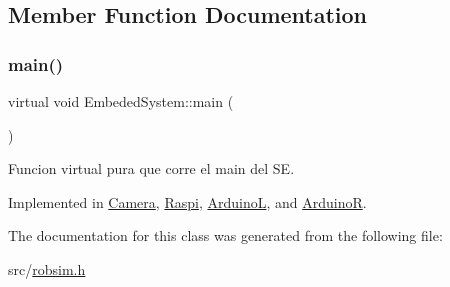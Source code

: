 \subsection{Member Function Documentation}
\mbox{\label{classEmbededSystem_a3a333d4954af4068f5e97301b4f55c48}} 
\subsubsection{\texorpdfstring{main()}{main()}}
{\footnotesize\ttfamily virtual void Embeded\+System\+::main (\begin{DoxyParamCaption}{ }\end{DoxyParamCaption})\hspace{0.3cm}{\ttfamily [pure virtual]}}



Funcion virtual pura que corre el main del SE. 



Implemented in \hyperlink{classCamera_a1719371e1e57ad18abfa5dd3d971bb39}{Camera}, \hyperlink{classRaspi_adce86197732891370a63b239cc413c7e}{Raspi}, \hyperlink{classArduinoL_a27a3e0f5bfbf48f558bce2d31a72d502}{ArduinoL}, and \hyperlink{classArduinoR_a479b06fd9527e9810b37b91da8fb0f7e}{ArduinoR}.



The documentation for this class was generated from the following file\+:\begin{DoxyCompactItemize}
\item 
src/\hyperlink{robsim_8h}{robsim.\+h}\end{DoxyCompactItemize}
